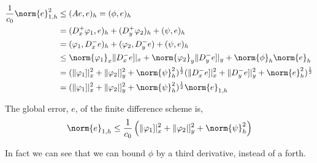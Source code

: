 \begin{align*}
  \frac{1}{c_0}\norm{e}^2_{1,h} &\le (Ae, e)_h = (\phi, e)_h \\
  &= (D_x^+ \varphi_1, e)_h + (D_y^+ \varphi_2)_h + (\psi, e)_h \\
  &= (\varphi_1, D_x^- e)_h + (\varphi_2, D_y^- e) + (\psi, e)_h \\
  &\le \norm{\varphi_1}_x \| D_x^-e]|_x + \norm{\varphi_2}_y \| D_y^-e]|_y +  \norm{\phi}_h\norm{e}_h \\
  &= (\|\varphi_1]|^2_x + \|\varphi_2|]^2_y + \norm{\psi}_h^2 )^{\frac{1}{2}} (\|D_x^- e]|_x^2 + \| D_y^- e]|_y^2 + \norm{e}_h^2 )^{\frac{1}{2}} \\
  &= (\|\varphi_1]|^2_x + \|\varphi_2|]^2_y + \norm{\psi}_h^2 )^{\frac{1}{2}} \norm{e}_{1,h}
\end{align*}

\begin{nlemma}
  The global error, $e$, of the finite difference scheme is,
  $$ \norm{e}_{1, h} \le \frac{1}{c_0}\left( \|\varphi_1]|^2_x + \|\varphi_2|]^2_y + \norm{\psi}_h^2 \right) $$
\end{nlemma}

\noindent
In fact we can see that we can bound $\phi$ by a third derivative, instead of a forth.